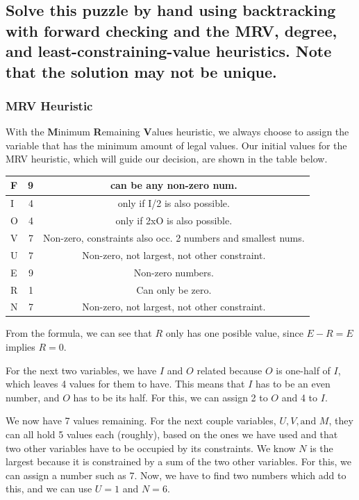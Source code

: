 \documentclass{article}
\begin{document}
	\subsection{Solve this puzzle by hand using backtracking with forward checking and the MRV, degree, and 
	least-constraining-value heuristics. Note that the solution may not be unique.}
		\subsubsection{MRV Heuristic}
			With the \textbf{M}inimum \textbf{R}emaining \textbf{V}alues heuristic, we always choose to 
			assign the variable that has the minimum amount of legal values. Our initial values for the
			MRV heuristic, which will guide our decision, are shown in the table below.
			\begin{center}
				\begin{tabular}{|l | r | c |}
					\hline
						F  & 9 & can be any non-zero num.\\\hline
						I  & 4 & only if I/2 is also possible.\\\hline
						O  & 4 & only if 2xO is also possible.\\\hline
						V  & 7 & Non-zero, constraints also occ. 2 numbers and smallest nums.\\\hline
						U  & 7 & Non-zero, not largest, not other constraint.\\\hline
						E  & 9 & Non-zero numbers.\\\hline
						R  & 1 & Can only be zero.\\\hline
						N  & 7 & Non-zero, not largest, not other constraint.\\
					\hline
				\end{tabular}
			\end{center}
			From the formula, we can see
			that $R$ only has one posible value, since $E - R = E$  implies $R = 0$.

			For the next two variables, we have $I$ and $O$ related because $O$ is one-half of $I$, which leaves
			4 values for them to have. This means
			that $I$ has to be an even number, and $O$ has to be its half. For this, we can assign 2 to $O$ and 
			4 to $I$. 

			We now have 7 values remaining. 
			For the next couple variables, $U, V,\textrm{and } M$, they can all hold 5 values each (roughly), 
			based on the ones we have used and that two other variables have to be occupied by its constraints. 
			We know $N$ is the largest because it is constrained by a sum of the two other variables. For 
			this, we can assign a number such as 7. Now, we have to find two numbers which add to this, 
			and we can use $U=1$ and $N = 6$.
\end{document}
